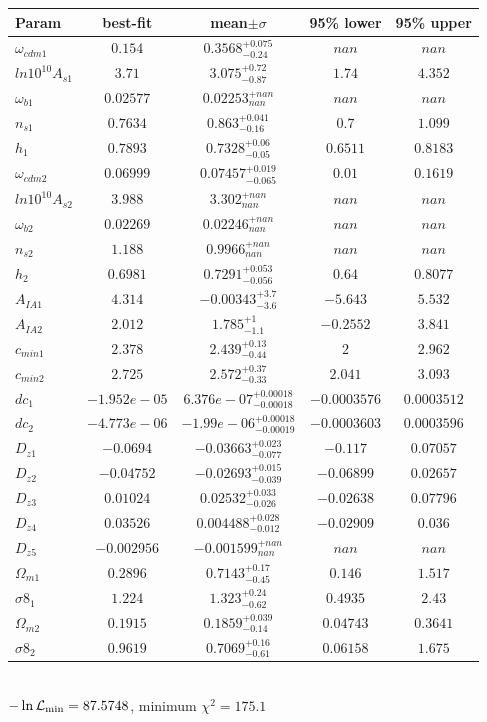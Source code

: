\begin{tabular}{|l|c|c|c|c|} 
 \hline 
Param & best-fit & mean$\pm\sigma$ & 95\% lower & 95\% upper \\ \hline 
$\omega_{cdm 1 }$ &$0.154$ & $0.3568_{-0.24}^{+0.075}$ & $nan$ & $nan$ \\ 
$ln10^{10}A_{s 1 }$ &$3.71$ & $3.075_{-0.87}^{+0.72}$ & $1.74$ & $4.352$ \\ 
$\omega_{b 1 }$ &$0.02577$ & $0.02253_{nan}^{+nan}$ & $nan$ & $nan$ \\ 
$n_{s 1 }$ &$0.7634$ & $0.863_{-0.16}^{+0.041}$ & $0.7$ & $1.099$ \\ 
$h_{1 }$ &$0.7893$ & $0.7328_{-0.05}^{+0.06}$ & $0.6511$ & $0.8183$ \\ 
$\omega_{cdm 2 }$ &$0.06999$ & $0.07457_{-0.065}^{+0.019}$ & $0.01$ & $0.1619$ \\ 
$ln10^{10}A_{s 2 }$ &$3.988$ & $3.302_{nan}^{+nan}$ & $nan$ & $nan$ \\ 
$\omega_{b 2 }$ &$0.02269$ & $0.02246_{nan}^{+nan}$ & $nan$ & $nan$ \\ 
$n_{s 2 }$ &$1.188$ & $0.9966_{nan}^{+nan}$ & $nan$ & $nan$ \\ 
$h_{2 }$ &$0.6981$ & $0.7291_{-0.056}^{+0.053}$ & $0.64$ & $0.8077$ \\ 
$A_{IA 1 }$ &$4.314$ & $-0.00343_{-3.6}^{+3.7}$ & $-5.643$ & $5.532$ \\ 
$A_{IA 2 }$ &$2.012$ & $1.785_{-1.1}^{+1}$ & $-0.2552$ & $3.841$ \\ 
$c_{min 1 }$ &$2.378$ & $2.439_{-0.44}^{+0.13}$ & $2$ & $2.962$ \\ 
$c_{min 2 }$ &$2.725$ & $2.572_{-0.33}^{+0.37}$ & $2.041$ & $3.093$ \\ 
$dc_{1 }$ &$-1.952e-05$ & $6.376e-07_{-0.00018}^{+0.00018}$ & $-0.0003576$ & $0.0003512$ \\ 
$dc_{2 }$ &$-4.773e-06$ & $-1.99e-06_{-0.00019}^{+0.00018}$ & $-0.0003603$ & $0.0003596$ \\ 
$D_{z1 }$ &$-0.0694$ & $-0.03663_{-0.077}^{+0.023}$ & $-0.117$ & $0.07057$ \\ 
$D_{z2 }$ &$-0.04752$ & $-0.02693_{-0.039}^{+0.015}$ & $-0.06899$ & $0.02657$ \\ 
$D_{z3 }$ &$0.01024$ & $0.02532_{-0.026}^{+0.033}$ & $-0.02638$ & $0.07796$ \\ 
$D_{z4 }$ &$0.03526$ & $0.004488_{-0.012}^{+0.028}$ & $-0.02909$ & $0.036$ \\ 
$D_{z5 }$ &$-0.002956$ & $-0.001599_{nan}^{+nan}$ & $nan$ & $nan$ \\ 
$\Omega_{m 1 }$ &$0.2896$ & $0.7143_{-0.45}^{+0.17}$ & $0.146$ & $1.517$ \\ 
$\sigma8_{1 }$ &$1.224$ & $1.323_{-0.62}^{+0.24}$ & $0.4935$ & $2.43$ \\ 
$\Omega_{m 2 }$ &$0.1915$ & $0.1859_{-0.14}^{+0.039}$ & $0.04743$ & $0.3641$ \\ 
$\sigma8_{2 }$ &$0.9619$ & $0.7069_{-0.61}^{+0.16}$ & $0.06158$ & $1.675$ \\ 
\hline 
 \end{tabular} \\ 
$-\ln{\cal L}_\mathrm{min} =87.5748$, minimum $\chi^2=175.1$ \\ 
